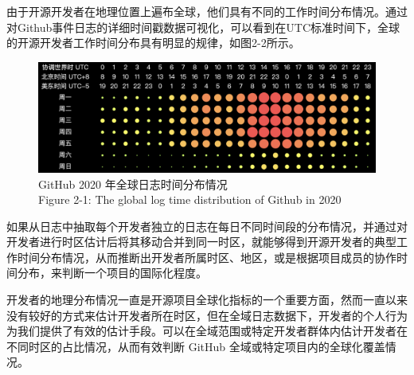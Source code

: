 \par 由于开源开发者在地理位置上遍布全球，他们具有不同的工作时间分布情况。通过对Github事件日志的详细时间戳数据可视化，可以看到在UTC标准时间下，全球的开源开发者工作时间分布具有明显的规律，如图2-2所示。
\begin{figure}[H]
    \centering
    \includegraphics[width=130mm]{./figures/image2-2.png}
    \caption{GitHub 2020 年全球日志时间分布情况\\Figure 2-1: The global log time distribution of Github in 2020}
\end{figure}

\par 如果从日志中抽取每个开发者独立的日志在每日不同时间段的分布情况，并通过对开发者进行时区估计后将其移动合并到同一时区，就能够得到开源开发者的典型工作时间分布情况，从而推断出开发者所属时区、地区，或是根据项目成员的协作时间分布，来判断一个项目的国际化程度。

\par 开发者的地理分布情况一直是开源项目全球化指标的一个重要方面，然而一直以来没有较好的方式来估计开发者所在时区，但在全域日志数据下，开发者的个人行为为我们提供了有效的估计手段。可以在全域范围或特定开发者群体内估计开发者在不同时区的占比情况，从而有效判断 GitHub 全域或特定项目内的全球化覆盖情况。


